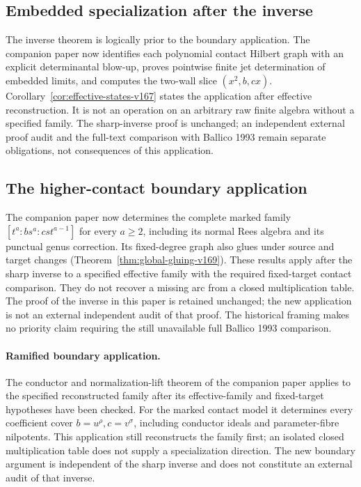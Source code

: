\documentclass[11pt,reqno]{amsart}
\numberwithin{equation}{section}
\theoremstyle{definition}\newtheorem{definition}[theorem]{Definition}
\theoremstyle{remark}\newtheorem{remark}[theorem]{Remark}
\begin{document}
\subsection{Embedded specialization after the inverse}
The inverse theorem is logically prior to the boundary application.
The companion paper now identifies each polynomial contact Hilbert
graph with an explicit determinantal blow-up, proves pointwise finite
jet determination of embedded limits, and computes the two-wall
slice $(x^2,b,cx)$. Corollary~\ref{cor:effective-states-v167}
states the application after effective reconstruction. It is not an
operation on an arbitrary raw finite algebra without a specified
family. The sharp-inverse proof is unchanged; an independent external
proof audit and the full-text comparison with Ballico 1993 remain
separate obligations, not consequences of this application.


\subsection{The higher-contact boundary application}
The companion paper now determines the complete marked family
$[t^a:bs^a:cst^{a-1}]$ for every $a\geq2$, including its normal Rees
algebra and its punctual genus correction. Its fixed-degree graph
also glues under source and target changes
(Theorem~\ref{thm:global-gluing-v169}). These results apply after the
sharp inverse to a specified effective family with the required
fixed-target contact comparison. They do not recover a missing arc
from a closed multiplication table. The proof of the inverse in this
paper is retained unchanged; the new application is not an external
independent audit of that proof. The historical framing makes no
priority claim requiring the still unavailable full Ballico 1993
comparison.


\paragraph{Ramified boundary application.}
The conductor and normalization-lift theorem of the companion paper
applies to the specified reconstructed family after its effective-family
and fixed-target hypotheses have been checked. For the marked contact
model it determines every coefficient cover $b=u^\rho,c=v^\sigma$,
including conductor ideals and parameter-fibre nilpotents. This
application still reconstructs the family first; an isolated closed
multiplication table does not supply a specialization direction.
The new boundary argument is independent of the sharp inverse and
does not constitute an external audit of that inverse.
\end{document}
